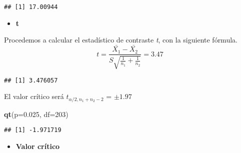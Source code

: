 \documentclass[
]{article}
\newenvironment{Shaded}{\begin{snugshade}}{\end{snugshade}}
\newcommand{\DataTypeTok}[1]{\textcolor[rgb]{0.13,0.29,0.53}{#1}}
\newcommand{\DecValTok}[1]{\textcolor[rgb]{0.00,0.00,0.81}{#1}}
\newcommand{\FloatTok}[1]{\textcolor[rgb]{0.00,0.00,0.81}{#1}}
\newcommand{\KeywordTok}[1]{\textcolor[rgb]{0.13,0.29,0.53}{\textbf{#1}}}
\newcommand{\NormalTok}[1]{#1}
\newcommand{\OperatorTok}[1]{\textcolor[rgb]{0.81,0.36,0.00}{\textbf{#1}}}
\newcommand{\StringTok}[1]{\textcolor[rgb]{0.31,0.60,0.02}{#1}}
\providecommand{\tightlist}{%
  \setlength{\itemsep}{0pt}\setlength{\parskip}{0pt}}
\begin{document}
\begin{verbatim}
## [1] 17.00944
\end{verbatim}

\begin{itemize}
\tightlist
\item
  \textbf{t}
\end{itemize}

Procedemos a calcular el estadístico de contraste \emph{t}, con la
siguiente fórmula.
\[t = \frac{\bar{X_1} - \bar{X_2}}{S\sqrt{\frac{1}{n_1} + \frac{1}{n_2}}} = 3.47\]

\begin{Shaded}
\end{Shaded}

\begin{verbatim}
## [1] 3.476057
\end{verbatim}

El valor crítico será \(t_{\alpha/2, n_1 + n_2 - 2}\) = \(\pm 1.97\)

\begin{Shaded}
\begin{Highlighting}[]
\KeywordTok{qt}\NormalTok{(}\DataTypeTok{p=}\FloatTok{0.025}\NormalTok{, }\DataTypeTok{df=}\DecValTok{203}\NormalTok{)}
\end{Highlighting}
\end{Shaded}

\begin{verbatim}
## [1] -1.971719
\end{verbatim}

\begin{itemize}
\tightlist
\item
  \textbf{Valor crítico}
\end{itemize}
\end{document}
